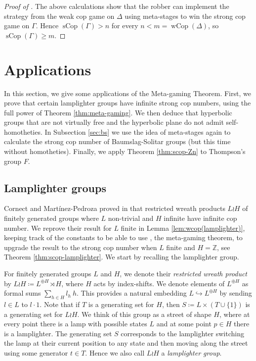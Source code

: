 \documentclass{amsart}
\theoremstyle{definition}
\theoremstyle{remark}
\theoremstyle{remark}
\theoremstyle{definition}
\newcommand{\sCop}{\operatorname{sCop}}
\newcommand{\wCop}{\operatorname{wCop}}
\newcommand{\into}{\hookrightarrow}
\renewcommand{\geq}{\geqslant}
\begin{document}
\begin{proof}[Proof of ]
The above calculations show that the robber can implement the strategy from the weak cop game on $\Delta$ using meta-stages to win the strong cop game on $\Gamma$. Hence $\operatorname{sCop}(\Gamma) > n$ for every $n< m = \wCop(\Delta)$, so $\sCop(\Gamma) \geq m$.
\end{proof}


\section{Applications}\label{sec:applications}

In this section, we give some applications of the Meta-gaming Theorem. First, we prove that certain lamplighter groups have infinite strong cop numbers, using the full power of Theorem \ref{thm:meta-gaming}. We then deduce that hyperbolic groups that are not virtually free and the hyperbolic plane do not admit self-homotheties. In Subsection \ref{sec:bs} we use the idea of meta-stages again to calculate the strong cop number of Baumslag-Solitar groups (but this time without homotheties). Finally, we apply Theorem \ref{thm:scop-Zn} to Thompson's group $F$.

\subsection{Lamplighter groups}

Cornect and Martínez-Pedroza proved in \cite[Theorem 1.5]{CoMa24arxiv} that restricted wreath products $L \wr H$ of finitely generated groups where $L$ non-trivial and $H$ infinite have infinite cop number. We reprove their result for $L$ finite in Lemma \ref{lem:wcop(lamplighter)}, keeping track of the constants to be able to use , the meta-gaming theorem, to upgrade the result to the strong cop number when $L$ finite and $H=\mathbb{Z}$, see Theorem \ref{thm:scop-lamplighter}. We start by recalling the lamplighter group.

For finitely generated groups \(L\) and \(H\), we denote their \emph{restricted wreath product} by \(L \wr H \coloneq L^{\oplus H} \rtimes H\), where \(H\) acts by index-shifts.
We denote elements of \(L^{\oplus H}\) as formal sums \(\sum_{h \in H} l_h~h\). This provides a natural embedding \(L \into L^{\oplus H}\) by sending \(l \in L\) to \(l\cdot 1\).
Note that if \(T\) is a generating set for \(H\), then \(S \coloneq L \times (T \cup \{1\})\) is a generating set for \(L \wr H\).
We think of this group as a street of shape \(H\), where at every point there is a lamp with possible states \(L\) and at some point \(p \in H\) there is a lamplighter.
The generating set \(S\) corresponds to the lamplighter switching the lamp at their current position to any state and then moving along the street using some generator \(t \in T\).
Hence we also call \(L \wr H\) a \emph{lamplighter group}.
\end{document}
